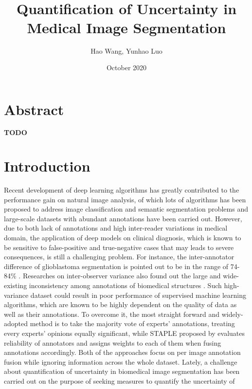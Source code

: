 \documentclass[12pt]{extarticle}
\title{Quantification of Uncertainty in Medical Image Segmentation}
\author{Hao Wang, Yunhao Luo}
\date{October 2020}
\begin{document}
\maketitle
\section*{Abstract}
\textbf{TODO}
\section{Introduction}
\paragraph{}
Recent development of deep learning algorithms has greatly contributed to
the performance gain on natural image analysis, of which lots
of algorithms has been proposed to address image classification and semantic
segmentation problems and large-scale datasets with abundant annotations have been
carried out\cite{nair_precup_arnold_arbel_2020}.
However, due to
both lack of annotations and high inter-reader variations\cite{zhang2020disentangling}
in medical domain, the application of deep models on clinical diagnosis,
which is known to be sensitive to false-positive and true-negative cases that may leads
to severe consequences, is still a challenging problem.
For instance, the inter-annotator difference of glioblastoma segmentation
is pointed out to be in the range of 74-84\% \cite{6975210}.
Researches on inter-observer variance also found out
the large and wide-existing inconsistency among annotations of biomedical structures
\cite{Variability2019}\cite{interobserver2018}. Such high-variance dataset 
could result in poor performance of supervised machine learning algorithms,
which are known to be highly dependent on the quality of data as well as their annotations.
To overcome it, the most straight forward and widely-adopted method 
is to take the majority vote of experts' annotations, treating every 
experts' opinions equally significant\cite{6975210}, while STAPLE proposed by \cite{STAPLE} 
evaluates reliability of annotators and assigns weights to each of them when 
fusing annotations accordingly. Both of the approaches focus on per image annotation fusion
while ignoring information across the whole dataset\cite{zhang2020disentangling}.
Lately, a challenge about quantification of uncertainty 
in biomedical image segmentation has been carried
out on the purpose of seeking measures to quantify the uncertainty of 
\end{document}
